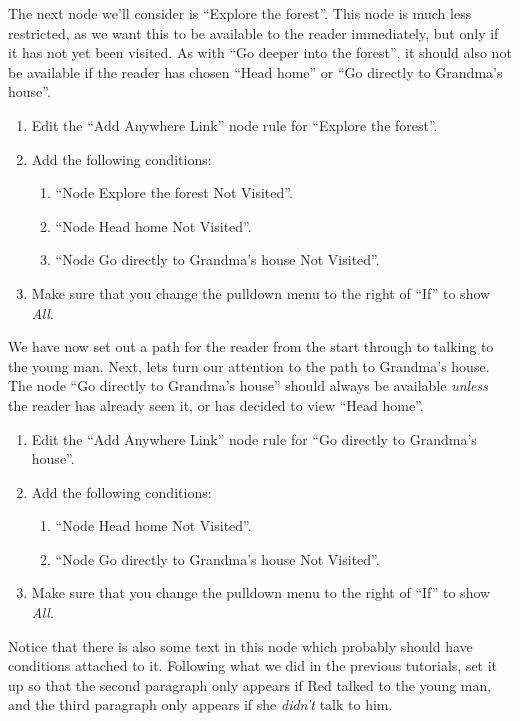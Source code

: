 \documentclass{article}
\begin{document}
The next node we'll consider is ``Explore the forest''. This node is much less restricted, as we want this to be available to the reader immediately, but only if it has not yet been visited. As with ``Go deeper into the forest'', it should also not be available if the reader has chosen ``Head home'' or ``Go directly to Grandma's house''.

\begin{enumerate}
  \item Edit the ``Add Anywhere Link'' node rule for ``Explore the forest''.
  \item Add the following conditions: 
  \begin{enumerate}
  \item ``Node Explore the forest Not Visited''.
  \item ``Node Head home Not Visited''.
  \item ``Node Go directly to Grandma's house Not Visited''.
\end{enumerate}
\item Make sure that you change the pulldown menu to the right of ``If'' to show \textit{All}.
\end{enumerate}

We have now set out a path for the reader from the start through to talking to the young man. Next, lets turn our attention to the path to Grandma's house. The node ``Go directly to Grandma's house'' should always be available \textit{unless} the reader has already seen it, or has decided to view ``Head home''.

\begin{enumerate}
  \item Edit the ``Add Anywhere Link'' node rule for ``Go directly to Grandma's house''.
  \item Add the following conditions: 
  \begin{enumerate}
  \item ``Node Head home Not Visited''.
  \item ``Node Go directly to Grandma's house Not Visited''.
\end{enumerate}
\item Make sure that you change the pulldown menu to the right of ``If'' to show \textit{All}.
\end{enumerate}

Notice that there is also some text in this node which probably should have conditions attached to it. Following what we did in the previous tutorials, set it up so that the second paragraph only appears if Red talked to the young man, and the third paragraph only appears if she \textit{didn't} talk to him.
\end{document}
